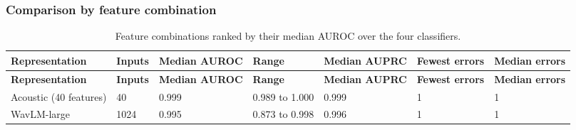 \documentclass[11pt,a4paper]{article}
\begin{document}
\subsubsection{Comparison by feature combination}
\begin{center}\small\renewcommand{\arraystretch}{1.15}
\begin{longtable}{>{\raggedright\arraybackslash}p{1.94cm}>{\raggedleft\arraybackslash}p{1.94cm}>{\raggedleft\arraybackslash}p{1.94cm}>{\raggedleft\arraybackslash}p{1.94cm}>{\raggedleft\arraybackslash}p{1.94cm}>{\raggedleft\arraybackslash}p{1.94cm}>{\raggedleft\arraybackslash}p{1.94cm}}
\caption{Feature combinations ranked by their median AUROC over the four classifiers.}\\
\toprule
\textbf{\hspace{0pt}Representation} & \textbf{\hspace{0pt}Inputs} & \textbf{\hspace{0pt}Median AUROC} & \textbf{\hspace{0pt}Range} & \textbf{\hspace{0pt}Median AUPRC} & \textbf{\hspace{0pt}Fewest errors} & \textbf{\hspace{0pt}Median errors}\\\midrule\endfirsthead
\toprule
\textbf{\hspace{0pt}Representation} & \textbf{\hspace{0pt}Inputs} & \textbf{\hspace{0pt}Median AUROC} & \textbf{\hspace{0pt}Range} & \textbf{\hspace{0pt}Median AUPRC} & \textbf{\hspace{0pt}Fewest errors} & \textbf{\hspace{0pt}Median errors}\\\midrule\endhead
\bottomrule\endfoot
\hspace{0pt}Acoustic (40 features) & \hspace{0pt}40 & \hspace{0pt}0.999 & \hspace{0pt}0.989 to 1.000 & \hspace{0pt}0.999 & \hspace{0pt}1 & \hspace{0pt}1\\
\hspace{0pt}WavLM-large & \hspace{0pt}1024 & \hspace{0pt}0.995 & \hspace{0pt}0.873 to 0.998 & \hspace{0pt}0.996 & \hspace{0pt}1 & \hspace{0pt}1\\

\end{longtable}
\end{center}
\end{document}
